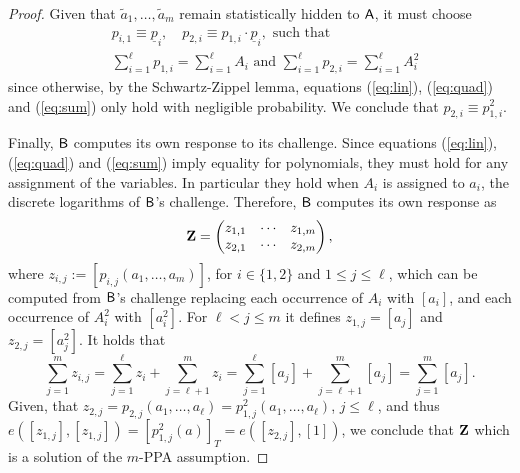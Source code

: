 \begin{proof}
Given that $\tilde{a}_{1},\ldots,\tilde{a}_{m}$ remain statistically hidden to $\mathsf{A}$, it must choose
\begin{align*}
&p_{i,1}\equiv \underline{p}_i, \quad p_{2,i}\equiv p_{1,i}\cdot \underline{p}_i,\text{ such that }\\
&\sum_{i=1}^\ell p_{1,i} = \sum_{i=1}^\ell A_{i} \text{ and } \sum_{i=1}^\ell p_{2,i} = \sum_{i=1}^\ell A_{i}^2
\end{align*}
since otherwise, by the Schwartz-Zippel lemma, equations (\ref{eq:lin}), (\ref{eq:quad}) and (\ref{eq:sum}) only hold with negligible probability. We conclude that $p_{2,i}\equiv p^2_{1,i}$.

Finally, $\mathsf{B}$ computes its own response to its challenge. Since equations (\ref{eq:lin}), (\ref{eq:quad}) and (\ref{eq:sum}) imply equality for polynomials, they must hold for any assignment of the variables. In particular they hold when $A_{i}$ is assigned to $a_{i}$, the discrete logarithms of $\mathsf{B}$'s challenge. Therefore, $\mathsf{B}$ computes its own response as
$$
\mathbf{{Z}} = \begin{pmatrix}
	z_{1,1}&\cdots&z_{1,m}\\z_{2,1}&\cdots&z_{2,m}
\end{pmatrix},
$$
where $z_{i,j} := [p_{i,j}(a_{1},\ldots,a_m)]$, for $i\in\{1,2\}$ and $1\leq j \leq \ell$, which can be computed from $\mathsf{B}$'s challenge replacing each occurrence of $A_i$ with $[a_i]$, and each occurrence of $A_i^2$ with  $[a_i^2]$. For $\ell < j\leq m$ it defines $z_{1,j} = [a_j]$ and $z_{2,j} = [a_j^2]$. It holds that
$$
\sum_{j=1}^m z_{i,j} = \sum_{j=1}^\ell z_i + \sum_{j=\ell+1}^m z_i = \sum_{j=1}^\ell [a_j] + \sum_{j=\ell+1}^m [a_j] = \sum_{j=1}^m [a_j].
$$
Given, that $z_{2,j} = p_{2,j}(a_1,\ldots,a_\ell) = p_{1,j}^2(a_1,\ldots,a_\ell)$, $j\leq \ell$, and thus $e([z_{1,j}],[z_{1,j}]) = [p_{1,j}^2(a)]_T = e([z_{2,j}],[1])$, we conclude that  $\mathbf{{Z}}$ which is a solution of the $m$-PPA assumption.
\end{proof}

